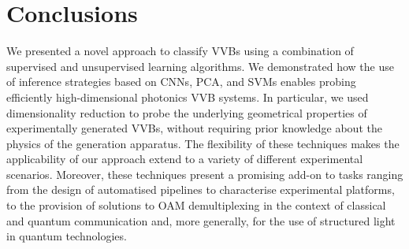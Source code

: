 \section{Conclusions}
\label{sec:VVBs:conclusions}

We presented a novel approach to classify \acp{VVB} using a combination of supervised and unsupervised learning algorithms. We demonstrated how the use of inference strategies based on CNNs, PCA, and SVMs enables probing efficiently high-dimensional photonics \ac{VVB} systems.
In particular, we used dimensionality reduction to probe the underlying geometrical properties of experimentally generated VVBs, without requiring prior knowledge about the physics of the generation apparatus.
The flexibility of these techniques makes the applicability of our approach extend to a variety of different experimental scenarios.
Moreover, these techniques present a promising add-on to tasks ranging from the design of automatised pipelines to characterise experimental platforms, to the provision of solutions to OAM demultiplexing in the context of classical and quantum communication and, more generally, for the use of structured light in quantum technologies.

